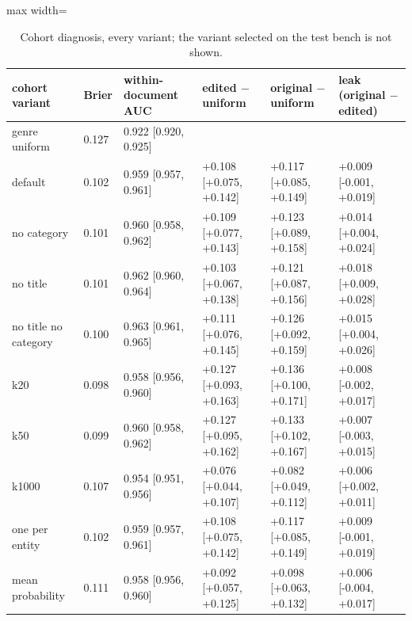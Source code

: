 \documentclass[11pt,a4paper]{article}
\begin{document}
\begin{table}[H]
\begin{adjustbox}{max width=\linewidth}
\begin{tabular}{llllll}
\toprule
cohort variant & Brier & within-document AUC & edited $-$ uniform & original $-$ uniform & leak (original $-$ edited) \\
\midrule
genre uniform & 0.127 & 0.922 [0.920, 0.925] &  &  &  \\
default & 0.102 & 0.959 [0.957, 0.961] & +0.108 [+0.075, +0.142] & +0.117 [+0.085, +0.149] & +0.009 [-0.001, +0.019] \\
no category & 0.101 & 0.960 [0.958, 0.962] & +0.109 [+0.077, +0.143] & +0.123 [+0.089, +0.158] & +0.014 [+0.004, +0.024] \\
no title & 0.101 & 0.962 [0.960, 0.964] & +0.103 [+0.067, +0.138] & +0.121 [+0.087, +0.156] & +0.018 [+0.009, +0.028] \\
no title no category & 0.100 & 0.963 [0.961, 0.965] & +0.111 [+0.076, +0.145] & +0.126 [+0.092, +0.159] & +0.015 [+0.004, +0.026] \\
k20 & 0.098 & 0.958 [0.956, 0.960] & +0.127 [+0.093, +0.163] & +0.136 [+0.100, +0.171] & +0.008 [-0.002, +0.017] \\
k50 & 0.099 & 0.960 [0.958, 0.962] & +0.127 [+0.095, +0.162] & +0.133 [+0.102, +0.167] & +0.007 [-0.003, +0.015] \\
k1000 & 0.107 & 0.954 [0.951, 0.956] & +0.076 [+0.044, +0.107] & +0.082 [+0.049, +0.112] & +0.006 [+0.002, +0.011] \\
one per entity & 0.102 & 0.959 [0.957, 0.961] & +0.108 [+0.075, +0.142] & +0.117 [+0.085, +0.149] & +0.009 [-0.001, +0.019] \\
mean probability & 0.111 & 0.958 [0.956, 0.960] & +0.092 [+0.057, +0.125] & +0.098 [+0.063, +0.132] & +0.006 [-0.004, +0.017] \\
\bottomrule
\end{tabular}
\end{adjustbox}
\caption{Cohort diagnosis, every variant; the variant selected on the test bench is not shown.}
\end{table}
\end{document}
